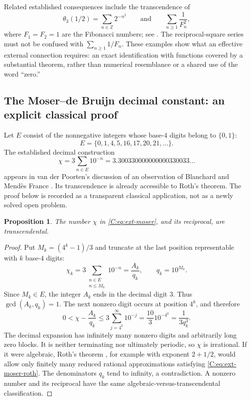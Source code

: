 \documentclass[11pt,a4paper]{article}
\newtheorem{proposition}[theorem]{Proposition}
\theoremstyle{definition}
\theoremstyle{remark}
\numberwithin{equation}{section}
\begin{document}
Related established consequences include the transcendence of
\[
 \theta_3(1/2)=\sum_{n\in\mathbb Z}2^{-n^2}
 \qquad\text{and}\qquad
 \sum_{n\ge1}\frac1{F_n^2},
\]
where $F_1=F_2=1$ are the Fibonacci numbers; see
\cite[Theorem~46 and Corollaries~51--52]{R089}.
The reciprocal-square series must not be confused with
$\sum_{n\ge1}1/F_n$.  These examples show what an effective external
connection requires: an exact identification with functions covered by a
substantial theorem, rather than numerical resemblance or a shared use of
the word ``zero.''

\subsection{The Moser--de Bruijn decimal constant: an explicit classical proof}

Let $E$ consist of the nonnegative integers whose base-$4$ digits belong to
$\{0,1\}$:
\[
 E=\{0,1,4,5,16,17,20,21,\ldots\}.
\]
The established decimal construction
\begin{equation}
 \chi=3\sum_{n\in E}10^{-n}
 =3.300330000000000330033\ldots
 \label{C:eq:ext-moser}
\end{equation}
appears in van der Poorten's discussion of an observation of Blanchard and
Mend\`es France \cite{R090}.  Its transcendence is already accessible
to Roth's theorem.  The proof below is recorded as a transparent classical
application, not as a newly solved open problem.

\begin{proposition}
The number $\chi$ in \eqref{C:eq:ext-moser}, and its reciprocal, are
transcendental.
\end{proposition}
\begin{proof}
Put $M_k=(4^k-1)/3$ and truncate at the last position representable with
$k$ base-$4$ digits:
\[
 \chi_k=3\sum_{\substack{n\in E\\n\le M_k}}10^{-n}
 =\frac{A_k}{q_k},\qquad q_k=10^{M_k}.
\]
Since $M_k\in E$, the integer $A_k$ ends in the decimal digit $3$.
Thus $\gcd(A_k,q_k)=1$.  The next nonzero digit occurs at position $4^k$,
and therefore
\begin{equation}
 0<\chi-\frac{A_k}{q_k}
 \le3\sum_{j=4^k}^{\infty}10^{-j}
 =\frac{10}{3}10^{-4^k}
 =\frac1{3q_k^3}.
 \label{C:eq:ext-moser-roth}
\end{equation}
The decimal expansion has infinitely many nonzero digits and arbitrarily
long zero blocks.  It is neither terminating nor ultimately periodic, so
$\chi$ is irrational.  If it were algebraic, Roth's theorem
\cite{R091}, for example with exponent $2+1/2$, would allow only
finitely many reduced rational approximations satisfying
\eqref{C:eq:ext-moser-roth}.  The denominators $q_k$ tend to infinity,
a contradiction.  A nonzero number and its reciprocal have the same
algebraic-versus-transcendental classification.
\end{proof}
\end{document}

